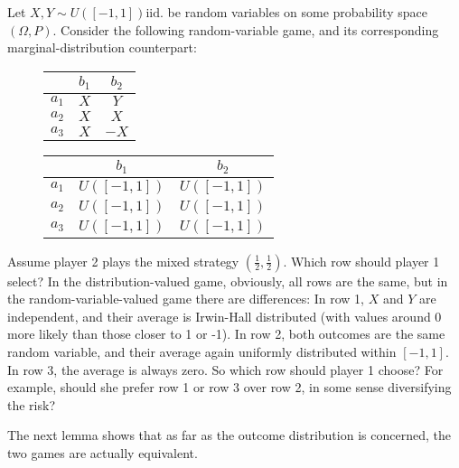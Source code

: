 \documentclass[a4paper]{scrreprt}
\begin{document}
    \begin{ex}
        Let $X, Y \sim U([-1, 1]) \text{iid.}$ be random variables on some probability space $(\Omega, P)$.
        Consider the following random-variable game, and its corresponding marginal-distribution counterpart:
        \begin{figure}[h]
            \centering
            \begin{tabular}{c|c|c|}
            	      & $b_1$ & $b_2$ \\ \hline
            	$a_1$ &  $X$  &  $Y$  \\ \hline
            	$a_2$ &  $X$  &  $X$  \\ \hline
            	$a_3$ &  $X$  & $-X$  \\ \hline
            \end{tabular}
            \quad
            \begin{tabular}{c|c|c|}
            	      &    $b_1$     &    $b_2$     \\ \hline
            	$a_1$ & $U([-1, 1])$ & $U([-1, 1])$ \\ \hline
            	$a_2$ & $U([-1, 1])$ & $U([-1, 1])$ \\ \hline
            	$a_3$ & $U([-1, 1])$ & $U([-1, 1])$ \\ \hline
            \end{tabular}
        \end{figure}
    
        Assume player 2 plays the mixed strategy $(\frac{1}{2}, \frac{1}{2})$. Which row should player 1 select?
        In the distribution-valued game, obviously, all rows are the same, but in the random-variable-valued game there are differences:
        In row 1, $X$ and $Y$ are independent, and their average is Irwin-Hall distributed (with values around 0 more likely than those closer to 1 or -1).
        In row 2, both outcomes are the same random variable, and their average again uniformly distributed within $[-1, 1]$.
        In row 3, the average is always zero. So which row should player 1 choose? For example, should she prefer row 1 or row 3 over row 2, in some sense diversifying the risk? 
        
        The next lemma shows that as far as the outcome distribution is concerned, the two games are actually equivalent.
    \end{ex}
\end{document}
